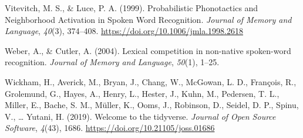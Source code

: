 \documentclass[
]{article}
\newlength{\cslhangindent}
\newenvironment{CSLReferences}[2] %
 {\begin{list}{}{%
  \setlength{\itemindent}{0pt}
  \setlength{\leftmargin}{0pt}
  \setlength{\parsep}{0pt}
  \ifodd #1
   \setlength{\leftmargin}{\cslhangindent}
   \setlength{\itemindent}{-1\cslhangindent}
  \fi
  \setlength{\itemsep}{#2\baselineskip}}}
 {\end{list}}
\begin{document}
\begin{CSLReferences}{1}{0}
Vitevitch, M. S., \& Luce, P. A. (1999). Probabilistic {Phonotactics}
and {Neighborhood Activation} in {Spoken Word Recognition}.
\emph{Journal of Memory and Language}, \emph{40}(3), 374--408.
\url{https://doi.org/10.1006/jmla.1998.2618}

Weber, A., \& Cutler, A. (2004). Lexical competition in non-native
spoken-word recognition. \emph{Journal of Memory and Language},
\emph{50}(1), 1--25.

Wickham, H., Averick, M., Bryan, J., Chang, W., McGowan, L. D.,
François, R., Grolemund, G., Hayes, A., Henry, L., Hester, J., Kuhn, M.,
Pedersen, T. L., Miller, E., Bache, S. M., Müller, K., Ooms, J.,
Robinson, D., Seidel, D. P., Spinu, V., \ldots{} Yutani, H. (2019).
Welcome to the tidyverse. \emph{Journal of Open Source Software},
\emph{4}(43), 1686. \url{https://doi.org/10.21105/joss.01686}

\end{CSLReferences}
\end{document}
